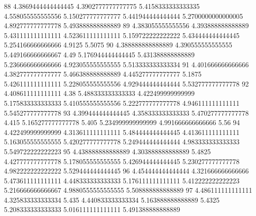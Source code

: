 88 4.3869444444444445 4.3902777777777775 5.4158333333333335 4.558055555555556 5.150277777777777 5.441944444444444 5.2700000000000005 4.892777777777778 5.493888888888889
89 4.383055555555556 4.393888888888889 5.431111111111111 4.523611111111111 5.159722222222222 5.434444444444445 5.254166666666666 4.9125 5.5075
90 4.388888888888889 4.390555555555555 5.449166666666667 4.49 5.176944444444445 5.431388888888889 5.236666666666666 4.923055555555555 5.513333333333334
91 4.401666666666666 4.382777777777777 5.466388888888889 4.445277777777777 5.1875 5.426111111111111 5.228055555555556 4.929444444444444 5.532777777777778
92 4.408611111111111 4.38 5.488333333333333 4.422499999999999 5.175833333333333 5.410555555555556 5.222777777777778 4.946111111111111 5.545277777777778
93 4.399444444444445 4.358333333333333 5.470277777777778 4.415 5.165277777777778 5.405 5.234999999999999 4.991666666666666 5.56
94 4.422499999999999 4.313611111111111 5.484444444444445 4.413611111111111 5.163055555555555 5.420277777777778 5.249444444444444 4.983333333333333 5.549722222222223
95 4.438888888888889 4.303888888888889 5.4825 4.427777777777778 5.178055555555555 5.426944444444445 5.230277777777778 4.982222222222222 5.529444444444445
96 4.454444444444444 4.321666666666666 5.473611111111111 4.448333333333333 5.176111111111111 5.412222222222223 5.216666666666667 4.9880555555555555 5.508888888888889
97 4.486111111111111 4.325833333333334 5.435 4.440833333333334 5.163888888888889 5.4325 5.208333333333333 5.016111111111111 5.491388888888889
